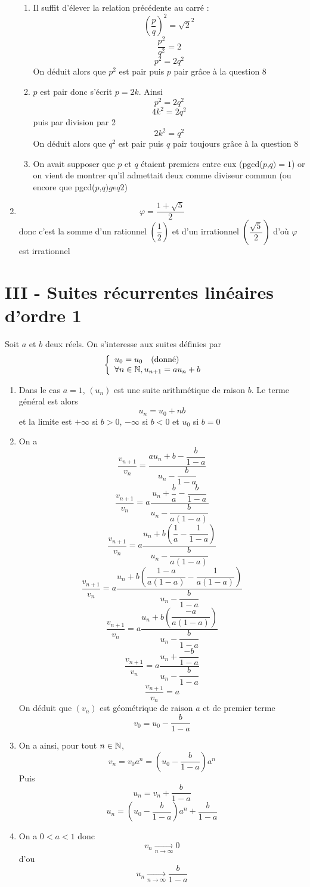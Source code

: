 \begin{enumerate}
\begin{enumerate}
\item Il suffit d'élever la relation précédente au carré : $$\left(\dfrac{p}{q}\right)^2 = \sqrt{2}^2$$
$$\dfrac{p^2}{q^2} = 2$$
$$p^2 = 2q^2$$
On déduit alors que $p^2$ est pair puis $p$ pair grâce à la question 8
\item $p$ est pair donc s'écrit $p = 2k$. Ainsi 
$$p^2 = 2q^2$$
$$4k^2 = 2q^2$$
puis par division par 2
$$2k^2 = q^2$$
On déduit alors que $q^2$ est pair puis $q$ pair toujours grâce à la question 8
\item On avait supposer que $p$ et $q$ étaient premiers entre eux (pgcd($p$,$q) = 1$) or on vient de montrer qu'il admettait deux comme diviseur commun (ou encore que pgcd($p$,$q) geq 2$)
\end{enumerate}
\item $$\varphi =  \dfrac{1+\sqrt{5}}{2}$$ donc c'est la somme d'un rationnel $\left(\dfrac{1}{2}\right)$ et d'un irrationnel $\left(\dfrac{\sqrt{5}}{2}\right)$ d'où $\varphi$ est irrationnel
\end{enumerate}
\section*{III - Suites récurrentes linéaires d'ordre 1}
Soit $a$ et $b$ deux réels. On s'interesse aux suites définies par $$\left\lbrace \begin{array}{l}
u_0 = u_0 \quad (\text{donné})\\
\forall n \in \mathbb{N}, u_{n+1} = au_n +b
\end{array}
\right.$$
\begin{enumerate}
\item Dans le cas $a=1$, $(u_n)$ est une suite arithmétique de raison $b$. Le terme général est alors $$u_n = u_0 + nb$$ et la limite est $+\infty$ si $b>0$, $-\infty$ si $b<0$ et $u_0$ si $b=0$
\item On a 
$$\dfrac{v_{n+1}}{v_n} = \dfrac{au_n+b - \dfrac{b}{1-a}}{u_n - \dfrac{b}{1-a}}$$
$$\dfrac{v_{n+1}}{v_n}  = a \dfrac{u_n + \dfrac{b}{a} - \dfrac{b}{1-a}}{u_n - \dfrac{b}{a(1-a)}}$$
$$\dfrac{v_{n+1}}{v_n}  = a \dfrac{u_n + b\left(\dfrac{1}{a} -\dfrac{1}{1-a}\right)}{u_n - \dfrac{b}{a(1-a)}}$$
$$\dfrac{v_{n+1}}{v_n}  = a \dfrac{u_n + b\left(\dfrac{1-a}{a(1-a)} -\dfrac{1}{a(1-a)}\right)}{u_n - \dfrac{b}{1-a}}$$
$$\dfrac{v_{n+1}}{v_n}  = a \dfrac{u_n + b\left(\dfrac{-a}{a(1-a)}\right)}{u_n - \dfrac{b}{1-a}}$$
$$\dfrac{v_{n+1}}{v_n}  = a \dfrac{u_n + \dfrac{-b}{1-a}}{u_n - \dfrac{b}{1-a}}$$
$$\dfrac{v_{n+1}}{v_n}  = a $$
On déduit que $(v_n)$ est géométrique de raison $a$ et de premier terme $$v_0 = u_0 - \dfrac{b}{1-a}$$
\item On a ainsi, pour tout $n\in \mathbb{N}$, 
$$\boxed{v_n = v_0 a^n =\left(u_0-\dfrac{b}{1-a}\right)a^n}$$
Puis 
$$u_n = v_n + \dfrac{b}{1-a}$$
$$\boxed{u_n = \left(u_0-\dfrac{b}{1-a}\right)a^n + \dfrac{b}{1-a}}$$
\item On a $0<a<1$ donc 
$$v_n\underset{n \rightarrow \infty}{\longrightarrow} 0$$
d'ou
$$\boxed{u_n\underset{n \rightarrow \infty}{\longrightarrow} \dfrac{b}{1-a}}$$
\end{enumerate}
